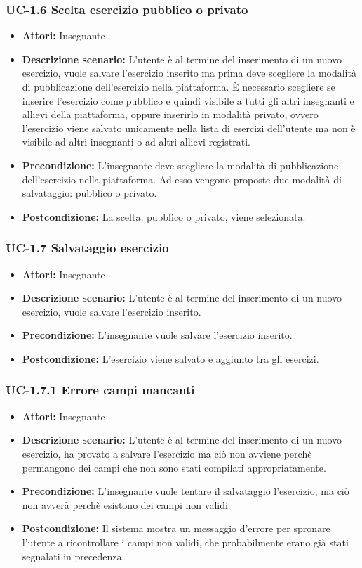 \subsubsection{UC-1.6 Scelta esercizio pubblico o privato}
\begin{itemize}
\item \textbf{Attori: }Insegnante
\item \textbf{Descrizione scenario: }L'utente è al termine del inserimento di un nuovo esercizio, vuole salvare l'esercizio inserito ma prima deve scegliere la modalità di pubblicazione dell'esercizio nella piattaforma. È necessario scegliere se inserire l'esercizio come pubblico e quindi visibile a tutti gli altri insegnanti e allievi della piattaforma, oppure inserirlo in modalità privato, ovvero l'esercizio viene salvato unicamente nella lista di esercizi dell'utente ma non è visibile ad altri insegnanti o ad altri allievi registrati.
\item \textbf{Precondizione: }L'insegnante deve scegliere la modalità di pubblicazione dell'esercizio nella piattaforma. Ad esso vengono proposte due modalità di salvataggio: pubblico o privato.
\item \textbf{Postcondizione: }La scelta, pubblico o privato, viene selezionata.
\end{itemize}
\subsubsection{UC-1.7 Salvataggio esercizio}
\begin{itemize}
\item \textbf{Attori: }Insegnante
\item \textbf{Descrizione scenario: }L'utente è al termine del inserimento di un nuovo esercizio, vuole salvare l'esercizio inserito.
\item \textbf{Precondizione: }L'insegnante vuole salvare l'esercizio inserito.
\item \textbf{Postcondizione: }L'esercizio viene salvato e aggiunto tra gli esercizi.
\end{itemize}
\subsubsection{UC-1.7.1 Errore campi mancanti}
\begin{itemize}
\item \textbf{Attori: }Insegnante
\item \textbf{Descrizione scenario: }L'utente è al termine del inserimento di un nuovo esercizio, ha provato a salvare l'esercizio ma ciò non avviene perchè permangono dei campi che non sono stati compilati appropriatamente.
\item \textbf{Precondizione: }L'insegnante vuole tentare il salvataggio l'esercizio, ma ciò non avverà perchè esistono dei campi non validi.
\item \textbf{Postcondizione: }Il sistema mostra un messaggio d'errore per spronare l'utente a ricontrollare i campi non validi, che probabilmente erano già stati segnalati in precedenza.
\end{itemize}